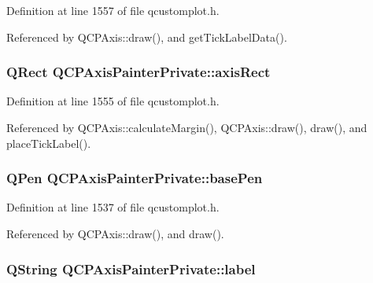 Definition at line 1557 of file qcustomplot.\+h.



Referenced by Q\+C\+P\+Axis\+::draw(), and get\+Tick\+Label\+Data().

\hypertarget{class_q_c_p_axis_painter_private_afcd55b0e1ecd689fffd2b1fc75dc7732}{}
\subsubsection[{axis\+Rect}]{\setlength{\rightskip}{0pt plus 5cm}Q\+Rect Q\+C\+P\+Axis\+Painter\+Private\+::axis\+Rect}\label{class_q_c_p_axis_painter_private_afcd55b0e1ecd689fffd2b1fc75dc7732}


Definition at line 1555 of file qcustomplot.\+h.



Referenced by Q\+C\+P\+Axis\+::calculate\+Margin(), Q\+C\+P\+Axis\+::draw(), draw(), and place\+Tick\+Label().

\hypertarget{class_q_c_p_axis_painter_private_ab4affb27ae3485fecb7466622cabcbb2}{}
\subsubsection[{base\+Pen}]{\setlength{\rightskip}{0pt plus 5cm}Q\+Pen Q\+C\+P\+Axis\+Painter\+Private\+::base\+Pen}\label{class_q_c_p_axis_painter_private_ab4affb27ae3485fecb7466622cabcbb2}


Definition at line 1537 of file qcustomplot.\+h.



Referenced by Q\+C\+P\+Axis\+::draw(), and draw().

\hypertarget{class_q_c_p_axis_painter_private_afe004c322f92543c0467afc02da6cf6d}{}
\subsubsection[{label}]{\setlength{\rightskip}{0pt plus 5cm}Q\+String Q\+C\+P\+Axis\+Painter\+Private\+::label}\label{class_q_c_p_axis_painter_private_afe004c322f92543c0467afc02da6cf6d}


